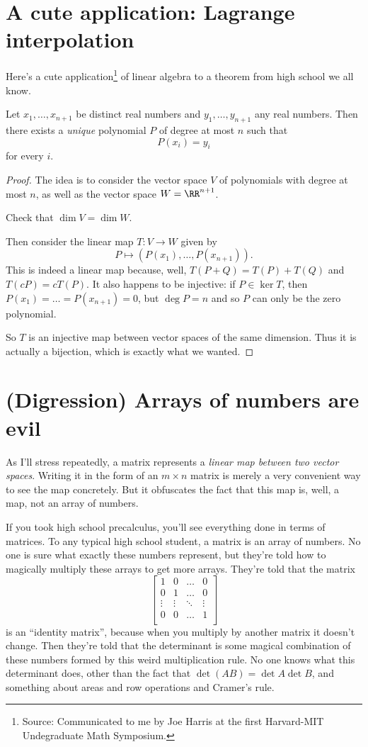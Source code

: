 \section{A cute application: Lagrange interpolation}
Here's a cute application\footnote{Source: Communicated to me
by Joe Harris at the first Harvard-MIT Undegraduate Math Symposium.}
of linear algebra to a theorem from high school we all know.
\begin{theorem}
	Let $x_1, \dots, x_{n+1}$ be distinct real numbers
	and $y_1, \dots, y_{n+1}$ any real numbers.
	Then there exists a \emph{unique} polynomial $P$ of degree at most $n$
	such that \[ P(x_i) = y_i \] for every $i$.
\end{theorem}
\begin{proof}
	The idea is to consider the vector space $V$ of polynomials with degree at most $n$,
	as well as the vector space $W = \RR^{n+1}$.
	\begin{ques}
		Check that $\dim V = \dim W$.
	\end{ques}
	Then consider the linear map $T : V \to W$ given by
	\[ P \mapsto \left( P(x_1), \dots, P(x_{n+1}) \right). \]
	This is indeed a linear map because, well, $T(P+Q) = T(P)+T(Q)$ and $T(cP) = cT(P)$.
	It also happens to be injective: if $P \in \ker T$,
	then $P(x_1) = \dots = P(x_{n+1}) = 0$,
	but $\deg P = n$ and so $P$ can only be the zero polynomial.
	
	So $T$ is an injective map between vector spaces of the same dimension.
	Thus it is actually a bijection, which is exactly what we wanted.
\end{proof}

\section{(Digression) Arrays of numbers are evil}
\label{sec:basis_evil}
As I'll stress repeatedly, a matrix represents a \emph{linear map between two vector spaces}.
Writing it in the form of an $m \times n$ matrix is merely a very convenient way to see the map concretely.
But it obfuscates the fact that this map is, well, a map, not an array of numbers.

If you took high school precalculus, you'll see everything done in terms of matrices.
To any typical high school student, a matrix is an array of numbers.
No one is sure what exactly these numbers represent,
but they're told how to magically multiply these arrays to get more arrays. 
They're told that the matrix
\[ \begin{bmatrix}
		1 & 0 & \dots & 0 \\
		0 & 1 & \dots & 0 \\
		\vdots & \vdots & \ddots & \vdots \\
		0 & 0 & \dots & 1 \\
	\end{bmatrix} \]
is an ``identity matrix'', because when you multiply
by another matrix it doesn't change.
Then they're told that the determinant is some magical combination of these
numbers formed by this weird multiplication rule.
No one knows what this determinant does,
other than the fact that $\det(AB) = \det A \det B$,
and something about areas and row operations and Cramer's rule.

